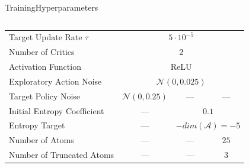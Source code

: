 \begin{frame}{Training}{Hyperparameters}
\begin{columns}
\begin{column}{0.7\textwidth}
{\begin{tabular}{l|ccc}
                    Target Update Rate \(\tau\) & \multicolumn{3}{c}{\(5 \cdot 10^{-5}\)}                                                                                       \\
                    Number of Critics           & \multicolumn{3}{c}{\(2\)}                                                                                                     \\
                    Activation Function         & \multicolumn{3}{c}{ReLU}                                                                                                      \\
                    Exploratory Action Noise    & \multicolumn{3}{c}{\(\mathcal{N}(0, 0.025)\)}                                                                                 \\ \hline
                    Target Policy Noise         & \(\mathcal{N}(0, 0.25)\)                                        & ---                                          & ---          \\ \hline
                    Initial Entropy Coefficient & ---                                                             & \multicolumn{2}{c}{\(0.1\)}                                 \\
                    Entropy Target              & ---                                                             & \multicolumn{2}{c}{\(-dim(\mathcal{A})=-5\)}                \\ \hline
                    Number of Atoms             & ---                                                             & ---                                          & \(25\)       \\
                    Number of Truncated Atoms   & ---                                                             & ---                                          & \(3\)        \\
                \end{tabular}
            }
        \end{column}
    \end{columns}
\end{frame}

